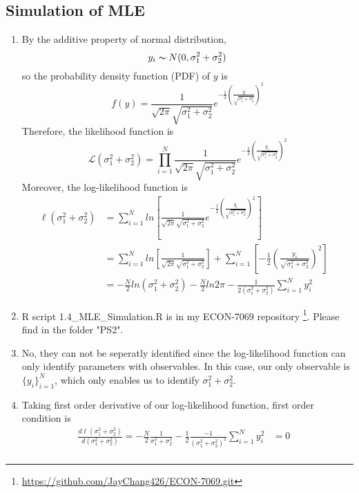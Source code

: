 \documentclass[12pt]{article}
\begin{document}
\subsection{Simulation of MLE} \label{MLE}
\begin{enumerate}
      \item By the additive property of normal distribution, $$y_i\thicksim N(0, \sigma^2_1 + \sigma^2_2)$$
            so the probability density function (PDF) of $y$ is $$f(y) = \frac{1}{\sqrt{2 \pi} \sqrt{\sigma^2_1 + \sigma^2_2}} e^{- \frac{1}{2} (\frac{y}{\sqrt{\sigma^2_1 + \sigma^2_2}})^2}$$
            Therefore, the likelihood function is $$\mathcal{L}(\sigma^2_1 + \sigma^2_2) = \prod_{i = 1}^{N} \frac{1}{\sqrt{2 \pi} \sqrt{\sigma^2_1 + \sigma^2_2}} e^{- \frac{1}{2} (\frac{y_i}{\sqrt{\sigma^2_1 + \sigma^2_2}})^2}$$
            Moreover, the log-likelihood function is 
            \begin{align}
            \boldsymbol \ell(\sigma^2_1 + \sigma^2_2) & = \sum_{i = 1}^{N} ln[\frac{1}{\sqrt{2 \pi} \sqrt{\sigma^2_1 + \sigma^2_2}} e^{- \frac{1}{2} (\frac{y_i}{\sqrt{\sigma^2_1 + \sigma^2_2}})^2}] & \nonumber \\ 
                                                      & = \sum_{i = 1}^{N} ln[\frac{1}{\sqrt{2 \pi} \sqrt{\sigma^2_1 + \sigma^2_2}}] + \sum_{i = 1}^{N} [- \frac{1}{2} (\frac{y_i}{\sqrt{\sigma^2_1 + \sigma^2_2}})^2] & \nonumber \\ 
                                                      & = -\frac{N}{2} ln(\sigma^2_1 + \sigma^2_2) -\frac{N}{2} ln2\pi - \frac{1}{2(\sigma^2_1 + \sigma^2_2)} \sum_{i = 1}^{N}y_i^2 & \nonumber
            \end{align}
      \item R script 1.4\_MLE\_Simulation.R is in my ECON-7069 repository \footnote{\url{https://github.com/JayChang426/ECON-7069.git}}.
            Please find in the folder "PS2".
      \item No, they can not be seperatly identified since the log-likelihood function can only identify parameters with observables. 
            In this case, our only observable is $\{y_i\}^N_{i = 1}$, which only enables us to identify $\sigma^2_1 + \sigma^2_2$.
      \item Taking first order derivative of our log-likelihood function, first order condition is
            \begin{align}
            \frac{d \boldsymbol \ell(\sigma^2_1 + \sigma^2_2)}{d (\sigma^2_1 + \sigma^2_2)} = -\frac{N}{2} \frac{1}{\sigma^2_1 + \sigma^2_2} - \frac{1}{2} \frac{-1}{(\sigma^2_1 + \sigma^2_2)^2} \sum_{i = 1}^{N}y_i^2 & = 0 & \nonumber \\ 

\end{align}
\end{enumerate}
\end{document}
